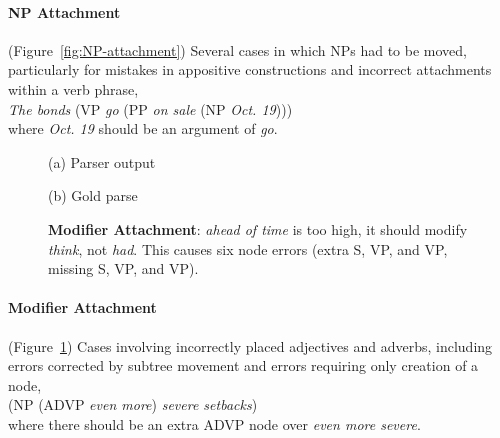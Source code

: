 \paragraph{NP Attachment} (Figure~\ref{fig:NP-attachment})  Several cases in which NPs had to be moved, particularly for mistakes in appositive constructions and incorrect attachments within a verb phrase, \myeg \\
\emph{The bonds} (VP \emph{go} (PP \emph{on sale} (NP \emph{Oct.\@\xspace 19}))) \\
where \emph{Oct.\@\xspace 19} should be an argument of \emph{go}.

\begin{figure}
\begin{center}

\vspace{3mm}
(a) Parser output

\vspace{6mm}


\vspace{3mm}
(b) Gold parse
\end{center}
\derivspace
\caption[Error analysis example: modifier attachment.]{ \label{fig:modifier-attachment} 
	\textbf{Modifier Attachment}: \emph{ahead of time} is too high, it should
	modify \emph{think}, not \emph{had}.  This causes six node errors (extra
	S, VP, and VP, missing S, VP, and VP).
}
\derivaftercompress
\end{figure}

\paragraph{Modifier Attachment} (Figure~\ref{fig:modifier-attachment})  Cases involving incorrectly placed adjectives
and adverbs, including errors corrected by subtree movement and errors
requiring only creation of a node, \myeg \\ (NP (ADVP \emph{even more})
\emph{severe setbacks}) \\ where there should be an extra ADVP node over
\emph{even more severe}.

